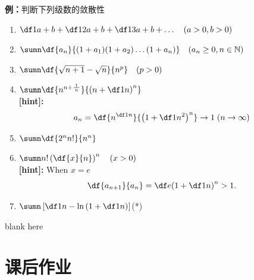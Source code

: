 {\bf 例：}判断下列级数的敛散性
\begin{enumerate}[(1)]
  \setlength{\itemindent}{1cm}
  
  \item $\df 1{a+b}+\df 1{2a+b}+\df 1{3a+b}+\ldots\quad (a>0,b>0)$
  \item $\sumn\df {a_n}{(1+a_1)(1+a_2)\ldots(1+a_n)}\quad(a_n\geq
	  0,n\in\mathbb{N})$
  
  \item $\sumn\df{\sqrt{n+1}-\sqrt{n}}{n^p}\quad(p>0)$
  \item $\sumn\df{n^{n+\frac 1{\,n\,}}}{\left(n+\df 1n\right)^n}$\\
  {\bf [hint]:}
  $$a_n=\df{n^{\df1n}}{\left(1+\df1{n^2}\right)^n}\to1\;(n\to\infty)$$
  \item $\sumn\df{2^nn!}{n^n}$
  \item $\sumn n!\left(\df{x}{n}\right)^n\quad (x>0)$\\
  {\bf [hint]:} When $x=e$
  $$\df{a_{n+1}}{a_n}=\df e{\left(1+\df1n\right)^n}>1.$$
  \item $\sumn\left[\df 1n-\ln\left(1+\df 1n\right)\right]$(*)
\end{enumerate}

\newpage

blank here

\newpage

\section*{课后作业}

